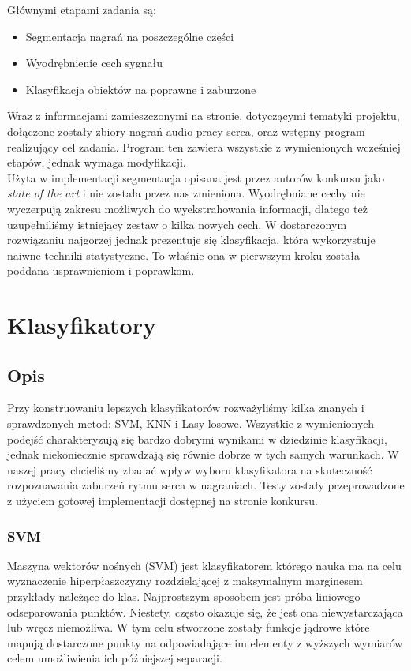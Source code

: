 \documentclass[a4paper]{report}
\begin{document}
Głównymi etapami zadania są:
\begin{itemize}
    \item Segmentacja nagrań na poszczególne części
    \item Wyodrębnienie cech sygnału
    \item Klasyfikacja obiektów na poprawne i zaburzone
\end{itemize}

Wraz z informacjami zamieszczonymi na stronie, dotyczącymi tematyki projektu, dołączone zostały zbiory nagrań audio pracy serca, oraz wstępny program realizujący cel zadania. Program ten zawiera wszystkie z wymienionych wcześniej etapów, jednak wymaga modyfikacji. \\
Użyta w implementacji segmentacja opisana jest przez autorów konkursu jako \textit{state of the art} i nie została przez nas zmieniona. Wyodrębniane cechy nie wyczerpują zakresu możliwych do wyekstrahowania informacji, dlatego też uzupełniliśmy istniejący zestaw o kilka nowych cech. W dostarczonym rozwiązaniu najgorzej jednak prezentuje się klasyfikacja, która wykorzystuje naiwne techniki statystyczne. To właśnie ona w pierwszym kroku została poddana usprawnieniom i poprawkom.\\

\section{Klasyfikatory}

\subsection{Opis}
Przy konstruowaniu lepszych klasyfikatorów rozważyliśmy kilka znanych i sprawdzonych metod: SVM, KNN i Lasy losowe. Wszystkie z wymienionych podejść charakteryzują się bardzo dobrymi wynikami w dziedzinie klasyfikacji, jednak niekoniecznie sprawdzają się równie dobrze w tych samych warunkach. W naszej pracy chcieliśmy zbadać wpływ wyboru klasyfikatora na skuteczność rozpoznawania zaburzeń rytmu serca w nagraniach. Testy zostały przeprowadzone z użyciem gotowej implementacji dostępnej na stronie konkursu.\\

\subsubsection{SVM}

Maszyna wektorów nośnych (SVM) jest klasyfikatorem którego nauka ma na celu wyznaczenie hiperpłaszczyzny rozdzielającej z maksymalnym marginesem przykłady należące do klas. Najprostszym sposobem jest próba liniowego odseparowania punktów. Niestety, często okazuje się, że jest ona niewystarczająca lub wręcz niemożliwa. W tym celu stworzone zostały funkcje jądrowe które mapują dostarczone punkty na odpowiadające im elementy z wyższych wymiarów celem umożliwienia ich późniejszej separacji. 
\end{document}
